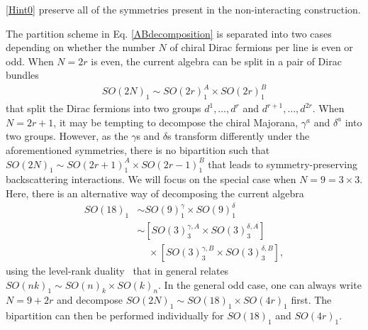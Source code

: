 \eqref{Hint0} preserve all of the symmetries present in the non-interacting construction.

The partition scheme in Eq. \eqref{ABdecomposition} is separated into two cases depending on whether the number $N$ of chiral Dirac fermions per line is even or odd. When $N=2r$ is even, the current algebra can be split in a pair of Dirac bundles \begin{align}SO(2N)_1\sim SO(2r)_1^A\times SO(2r)_1^B\label{evendecomposition}\end{align} that split the Dirac fermions into two groups $d^1,\ldots,d^r$ and $d^{r+1},\ldots,d^{2r}$. When $N=2r+1$, it may be tempting to decompose the chiral Majorana, $\gamma^a$ and $\delta^a$ into two groups. However, as the $\gamma$s and $\delta$s transform differently under the aforementioned symmetries, there is no bipartition such that $SO(2N)_1\sim SO(2r+1)_1^A\times SO(2r-1)_1^B$ that leads to symmetry-preserving backscattering interactions. We will focus on the special case when $N=9=3\times3$. Here, there is an alternative way of decomposing the current algebra \begin{align}SO(18)_1&\sim SO(9)_1^\gamma\times SO(9)_1^\delta\nonumber\\&\sim\left[SO(3)_3^{\gamma,A}\times SO(3)_3^{\delta,A}\right]\nonumber\\&\;\;\;\;\times\left[SO(3)_3^{\gamma,B}\times SO(3)_3^{\delta,B}\right],\label{N=9decomposition}\end{align} using the level-rank duality~\cite{bigyellowbook} that in general relates $SO(nk)_1\sim SO(n)_k\times SO(k)_n$. In the general odd case, one can always write $N=9+2r$ and decompose $SO(2N)_1\sim SO(18)_1\times SO(4r)_1$ first. The bipartition can then be performed individually for $SO(18)_1$ and $SO(4r)_1$.


